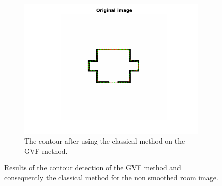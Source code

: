 \documentclass{article}
\begin{document}
\begin{figure}[H]
\begin{subfigure}{0.49\textwidth}
  \includegraphics[width=\linewidth]{6roomGVFthenClassical.png}
  \caption{The contour after using the classical method on the GVF method.}
  \label{fig10c}
\end{subfigure}
\caption{Results of the contour detection of the GVF method and consequently the classical method for the non smoothed room image.}
\label{fig10}
\end{figure}
\end{document}
